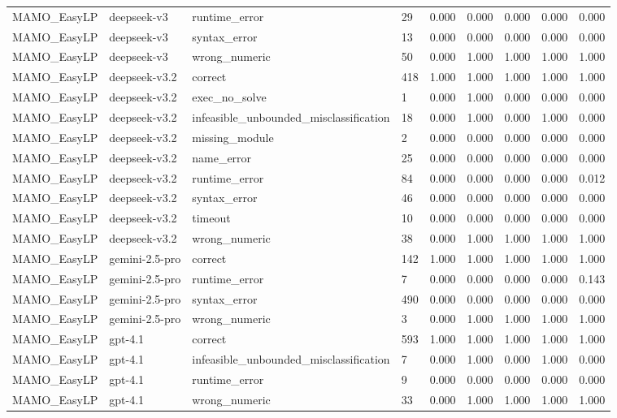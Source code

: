 \begin{table}[t]
\begin{tabular}{lllllllll}
MAMO\_EasyLP & deepseek-v3 & runtime\_error & 29 & 0.000 & 0.000 & 0.000 & 0.000 & 0.000 \\
MAMO\_EasyLP & deepseek-v3 & syntax\_error & 13 & 0.000 & 0.000 & 0.000 & 0.000 & 0.000 \\
MAMO\_EasyLP & deepseek-v3 & wrong\_numeric & 50 & 0.000 & 1.000 & 1.000 & 1.000 & 1.000 \\
MAMO\_EasyLP & deepseek-v3.2 & correct & 418 & 1.000 & 1.000 & 1.000 & 1.000 & 1.000 \\
MAMO\_EasyLP & deepseek-v3.2 & exec\_no\_solve & 1 & 0.000 & 1.000 & 0.000 & 0.000 & 0.000 \\
MAMO\_EasyLP & deepseek-v3.2 & infeasible\_unbounded\_misclassification & 18 & 0.000 & 1.000 & 0.000 & 1.000 & 0.000 \\
MAMO\_EasyLP & deepseek-v3.2 & missing\_module & 2 & 0.000 & 0.000 & 0.000 & 0.000 & 0.000 \\
MAMO\_EasyLP & deepseek-v3.2 & name\_error & 25 & 0.000 & 0.000 & 0.000 & 0.000 & 0.000 \\
MAMO\_EasyLP & deepseek-v3.2 & runtime\_error & 84 & 0.000 & 0.000 & 0.000 & 0.000 & 0.012 \\
MAMO\_EasyLP & deepseek-v3.2 & syntax\_error & 46 & 0.000 & 0.000 & 0.000 & 0.000 & 0.000 \\
MAMO\_EasyLP & deepseek-v3.2 & timeout & 10 & 0.000 & 0.000 & 0.000 & 0.000 & 0.000 \\
MAMO\_EasyLP & deepseek-v3.2 & wrong\_numeric & 38 & 0.000 & 1.000 & 1.000 & 1.000 & 1.000 \\
MAMO\_EasyLP & gemini-2.5-pro & correct & 142 & 1.000 & 1.000 & 1.000 & 1.000 & 1.000 \\
MAMO\_EasyLP & gemini-2.5-pro & runtime\_error & 7 & 0.000 & 0.000 & 0.000 & 0.000 & 0.143 \\
MAMO\_EasyLP & gemini-2.5-pro & syntax\_error & 490 & 0.000 & 0.000 & 0.000 & 0.000 & 0.000 \\
MAMO\_EasyLP & gemini-2.5-pro & wrong\_numeric & 3 & 0.000 & 1.000 & 1.000 & 1.000 & 1.000 \\
MAMO\_EasyLP & gpt-4.1 & correct & 593 & 1.000 & 1.000 & 1.000 & 1.000 & 1.000 \\
MAMO\_EasyLP & gpt-4.1 & infeasible\_unbounded\_misclassification & 7 & 0.000 & 1.000 & 0.000 & 1.000 & 0.000 \\
MAMO\_EasyLP & gpt-4.1 & runtime\_error & 9 & 0.000 & 0.000 & 0.000 & 0.000 & 0.000 \\
MAMO\_EasyLP & gpt-4.1 & wrong\_numeric & 33 & 0.000 & 1.000 & 1.000 & 1.000 & 1.000 \\

\end{tabular}
\end{table}

